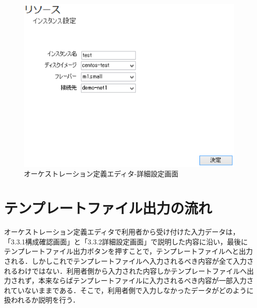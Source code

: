 \documentclass[mingoth]{kut-paper}		%
\begin{document}
			\begin{figure}[H]
				\begin{center}
					\includegraphics[scale=1.1]{Document/詳細設定画面.eps}
					\caption{オーケストレーション定義エディタ-詳細設定画面}
					\label{pic:4}
				\end{center}
			\end{figure}
	\section{テンプレートファイル出力の流れ}
	オーケストレーション定義エディタで利用者から受け付けた入力データは，「3.3.1構成確認画面」と「3.3.2詳細設定画面」で説明した内容に沿い，最後にテンプレートファイル出力ボタンを押すことで，テンプレートファイルへと出力される．しかしこれでテンプレートファイルへ入力されるべき内容が全て入力されるわけではない．利用者側から入力された内容しかテンプレートファイルへ出力されず，本来ならばテンプレートファイルに入力されるべき内容が一部入力されていないままである．そこで，利用者側で入力しなかったデータがどのように扱われるか説明を行う．
\end{document}
